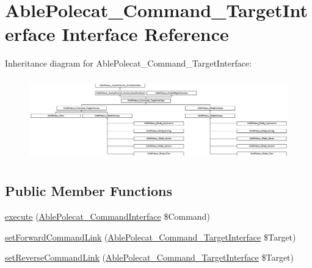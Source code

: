 \hypertarget{interface_able_polecat___command___target_interface}{}\section{Able\+Polecat\+\_\+\+Command\+\_\+\+Target\+Interface Interface Reference}
\label{interface_able_polecat___command___target_interface}
Inheritance diagram for Able\+Polecat\+\_\+\+Command\+\_\+\+Target\+Interface\+:\begin{figure}[H]
\begin{center}
\leavevmode
\includegraphics[height=3.612903cm]{interface_able_polecat___command___target_interface}
\end{center}
\end{figure}
\subsection*{Public Member Functions}
\begin{DoxyCompactItemize}
\item 
\hyperlink{interface_able_polecat___command___target_interface_aa7f01cbd17bffdbbb7511a3c37756064}{execute} (\hyperlink{interface_able_polecat___command_interface}{Able\+Polecat\+\_\+\+Command\+Interface} \$Command)
\item 
\hyperlink{interface_able_polecat___command___target_interface_aaff1150e0dda06868b9ae7b2a3b9b095}{set\+Forward\+Command\+Link} (\hyperlink{interface_able_polecat___command___target_interface}{Able\+Polecat\+\_\+\+Command\+\_\+\+Target\+Interface} \$Target)
\item 
\hyperlink{interface_able_polecat___command___target_interface_af3c33319c9af5cebf6598ce57dfcaf49}{set\+Reverse\+Command\+Link} (\hyperlink{interface_able_polecat___command___target_interface}{Able\+Polecat\+\_\+\+Command\+\_\+\+Target\+Interface} \$Target)
\end{DoxyCompactItemize}

